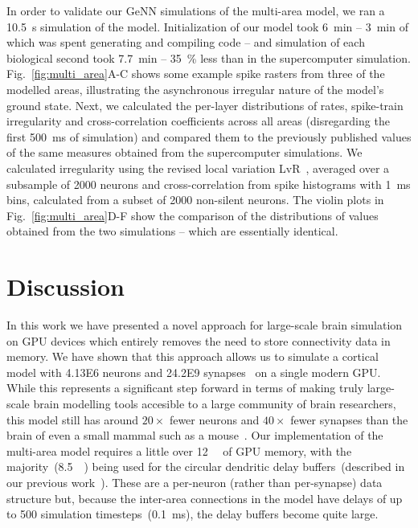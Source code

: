 \documentclass[9pt,twocolumn,twoside,lineno]{pnas-new}
\begin{document}
In order to validate our GeNN simulations of the multi-area model, we ran a \SI{10.5}{\second} simulation of the model.
Initialization of our model took \SI{6}{\minute} -- \SI{3}{\minute} of which was spent generating and compiling code -- and simulation of each biological second took \SI{7.7}{\minute} -- \SI{35}{\percent} less than in the supercomputer simulation.
Fig.~\ref{fig:multi_area}A-C shows some example spike rasters from three of the modelled areas, illustrating the asynchronous irregular nature of the model's ground state.
Next, we calculated the per-layer distributions of rates, spike-train irregularity and cross-correlation coefficients across all areas (disregarding the first \SI{500}{\milli\second} of simulation) and compared them to the previously published values of the same measures obtained from the supercomputer simulations.
We calculated irregularity using the revised local variation LvR~\citep{Shinomoto2009}, averaged over a subsample of \num{2000} neurons and cross-correlation from spike histograms with \SI{1}{\milli\second} bins, calculated from a subset of \num{2000} non-silent neurons.
The violin plots in Fig.~\ref{fig:multi_area}D-F show the comparison of the distributions of values obtained from the two simulations -- which are essentially identical.
%
\section*{Discussion}
In this work we have presented a novel approach for large-scale brain simulation on GPU devices which entirely removes the need to store connectivity data in memory.
We have shown that this approach allows us to simulate a cortical model with \num{4.13E6} neurons and \num{24.2E9} synapses~\citep{Schmidt2018a,Schmidt2018} on a single modern GPU.
While this represents a significant step forward in terms of making truly large-scale brain modelling tools accesible to a large community of brain researchers, this model still has around $20\times$ fewer neurons and $40\times$ fewer synapses than the brain of even a small mammal such as a mouse~\citep{Herculano-Houzel2010}.
Our implementation of the multi-area model requires a little over \SI{12}{\giga\byte} of GPU memory, with the majority~(\SI{8.5}{\giga\byte}) being used for the circular dendritic delay buffers~(described in our previous work~\citep{Knight2018}).
These are a per-neuron (rather than per-synapse) data structure but, because the inter-area connections in the model have delays of up to 500 simulation timesteps~(\SI{0.1}{\milli\second}), the delay buffers become quite large.
\end{document}
